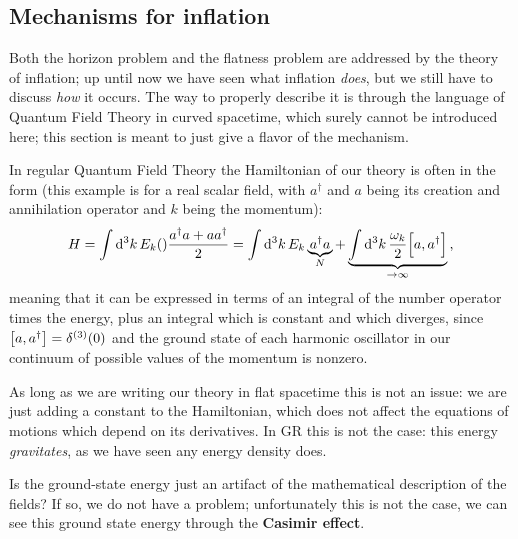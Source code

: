 \documentclass[main.tex]{subfiles}
\begin{document}
\subsection{Mechanisms for inflation}

Both the horizon problem and the flatness problem are addressed by the theory of inflation; up until now we have seen what inflation \emph{does}, but we still have to discuss \emph{how} it occurs. 
The way to properly describe it is through the language of Quantum Field Theory in curved spacetime, which surely cannot be introduced here; this section is meant to just give a flavor of the mechanism.


In regular Quantum Field Theory the Hamiltonian of our theory is often in the form (this example is for a real scalar field, with \(a ^\dag\) and \(a\) being its creation and annihilation operator and \(k\) being the momentum):
%
\begin{align}
H = \int \dd[3]{k} E_k \qty\frac{a ^\dag a + a a ^\dag}{2} = 
\int \dd[3]{k} E_k \underbrace{a ^\dag a }_{N} + \underbrace{\int \dd[3]{k} \frac{\omega_k}{2} \qty[a, a ^\dag]}_{ \to \infty }
\,,
\end{align}
%
meaning that it can be expressed in terms of an integral of the number operator times the energy, plus an integral which is constant and which diverges, since \(\qty[a, a ^\dag] = \delta^{(3)} (0)\) and the ground state of each harmonic oscillator in our continuum of possible values of the momentum is nonzero. 

As long as we are writing our theory in flat spacetime this is not an issue: we are just adding a constant to the Hamiltonian, which does not affect the equations of motions which depend on its derivatives.  
In GR this is not the case: this energy \emph{gravitates}, as we have seen any energy density does. 

Is the ground-state energy just an artifact of the mathematical description of the fields? If so, we do not have a problem; unfortunately this is not the case, we can see this ground state energy through the \textbf{Casimir effect}.
\end{document}
